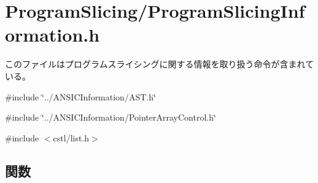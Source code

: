 \section{ProgramSlicing/ProgramSlicingInformation.h}
\label{ProgramSlicingInformation_8h}


このファイルはプログラムスライシングに関する情報を取り扱う命令が含まれている。  


{\ttfamily \#include \char`\"{}../ANSICInformation/AST.h\char`\"{}}\par
{\ttfamily \#include \char`\"{}../ANSICInformation/PointerArrayControl.h\char`\"{}}\par
{\ttfamily \#include $<$cstl/list.h$>$}\par
\subsection*{関数}
